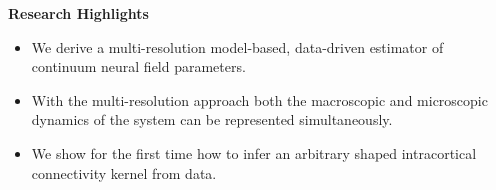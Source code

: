 \documentclass[]{article}
\begin{document}
\textbf{Research Highlights}
\begin{itemize}
	\item We derive a multi-resolution model-based, data-driven estimator of continuum neural field parameters.
	\item With the multi-resolution approach both the macroscopic and microscopic dynamics of the system can be represented simultaneously.
	\item We show for the first time how to infer an arbitrary shaped intracortical connectivity kernel from data.
\end{itemize}
\end{document}
